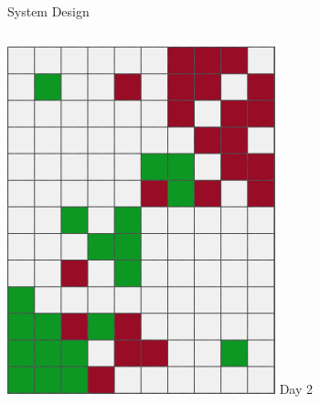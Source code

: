 \documentclass[9pt]{beamer}
\begin{document}
\begin{frame}{System Design}
\begin{columns}
\begin{column}{0.33\textwidth}
\begin{columns}
\begin{column}{0.5\textwidth}
\begin{center}
                        \includegraphics[width=\textwidth,trim={0cm 0cm 0cm 0cm},clip]{img/analyst2.png}
                        \newline
                        Day 2
                        \newline

\end{center}
\end{column}
\end{columns}
\end{column}
\end{columns}
\end{frame}
\end{document}
